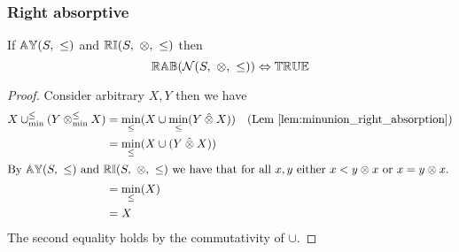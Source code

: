 \documentclass[../Summary.tex]{subfiles}
\begin{document}
\subsubsection{Right absorptive}

\begin{theorem} \label{thm:N_rab}
If ${\mathbb{AY}}(S,\ \leq)$ and ${\mathbb{RI}}(S,\ \otimes,\ \leq)$ then
\begin{equation*}
\propname{RAB}(\mathcal{N}(S,\ \otimes,\ \leq)) \Leftrightarrow \propname{TRUE}
\end{equation*}
\end{theorem}


\begin{proof}

\vspace{0.5em}
Consider arbitrary $X, Y$ then we have
\begin{align*}
X \minunion (Y \minlift X) 	& = \min_\leq(X \cup \min_\leq(Y \lift X)) & \text{(Lem \ref{lem:minunion_right_absorption})} \\
							& = \min_\leq(X \cup (Y \lift X)) \\
\intertext{By $\propname{AY}(S,\ \leq)$ and $\propname{RI}(S,\ \otimes,\ \leq)$ we have that for all $x, y$ either $x < y \otimes x$ or $x = y \otimes x$.}
							& = \min_\leq(X) \\
							& = X	
\end{align*}
The second equality holds by the commutativity of $\cup$.
\end{proof}
\end{document}
